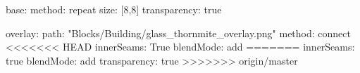 base:
  method: repeat
  size: [8,8]
  transparency: true

overlay:
  path: "Blocks/Building/glass_thornmite_overlay.png"
  method: connect
<<<<<<< HEAD
  innerSeams: True
blendMode: add
=======
  innerSeams: true
  blendMode: add
  transparency: true
>>>>>>> origin/master
